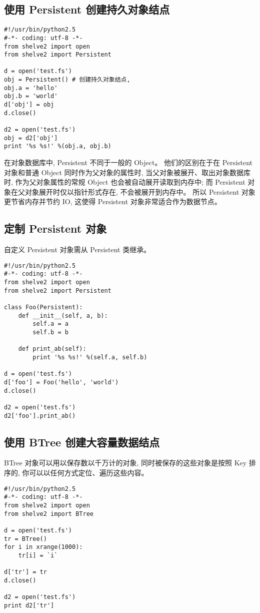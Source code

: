\documentclass{manual}
\begin{document}
\subsection{使用 Persistent 创建持久对象结点}

\begin{verbatim}
#!/usr/bin/python2.5
#-*- coding: utf-8 -*-
from shelve2 import open
from shelve2 import Persistent

d = open('test.fs')
obj = Persistent() # 创建持久对象结点,
obj.a = 'hello'
obj.b = 'world'
d['obj'] = obj
d.close()

d2 = open('test.fs')
obj = d2['obj']
print '%s %s!' %(obj.a, obj.b)
\end{verbatim}

在对象数据库中, Persistent 不同于一般的 Object。
他们的区别在于在 Persistent 对象和普通 Object 同时作为父对象的属性时,
当父对象被展开、取出对象数据库时, 作为父对象属性的常规 Object 也会被自动展开读取到内存中;
而 Persistent 对象在父对象展开时仅以指针形式存在, 不会被展开到内存中。
所以 Persistent 对象更节省内存并节约 IO, 这使得 Persistent 对象非常适合作为数据节点。

\subsection{定制 Persistent 对象}

自定义 Persistent 对象需从 Persistent 类继承。

\begin{verbatim}
#!/usr/bin/python2.5
#-*- coding: utf-8 -*-
from shelve2 import open
from shelve2 import Persistent

class Foo(Persistent):
	def __init__(self, a, b):
		self.a = a
		self.b = b

	def print_ab(self):
		print '%s %s!' %(self.a, self.b)

d = open('test.fs')
d['foo'] = Foo('hello', 'world')
d.close()

d2 = open('test.fs')
d2['foo'].print_ab()
\end{verbatim}

\subsection{使用 BTree 创建大容量数据结点}

BTree 对象可以用以保存数以千万计的对象, 同时被保存的这些对象是按照 Key 排序的, 你可以以任何方式定位、遍历这些内容。

\begin{verbatim}
#!/usr/bin/python2.5
#-*- coding: utf-8 -*-
from shelve2 import open
from shelve2 import BTree

d = open('test.fs')
tr = BTree()
for i in xrange(1000):
	tr[i] = `i`

d['tr'] = tr
d.close()

d2 = open('test.fs')
print d2['tr']
\end{verbatim}
\end{document}
